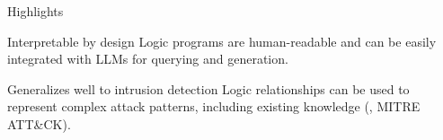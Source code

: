 %     

\begin{frame}{Highlights}

  \begin{block}{Interpretable by design}
    Logic programs are \alert{human-readable} and can be easily integrated with LLMs for querying and generation.
  \end{block}

  \pause
  \begin{block}{Generalizes well to intrusion detection}
    Logic relationships can be used to represent complex attack patterns, including \alert{existing knowledge} (\eg, MITRE ATT\&CK).
  \end{block}
\end{frame}

